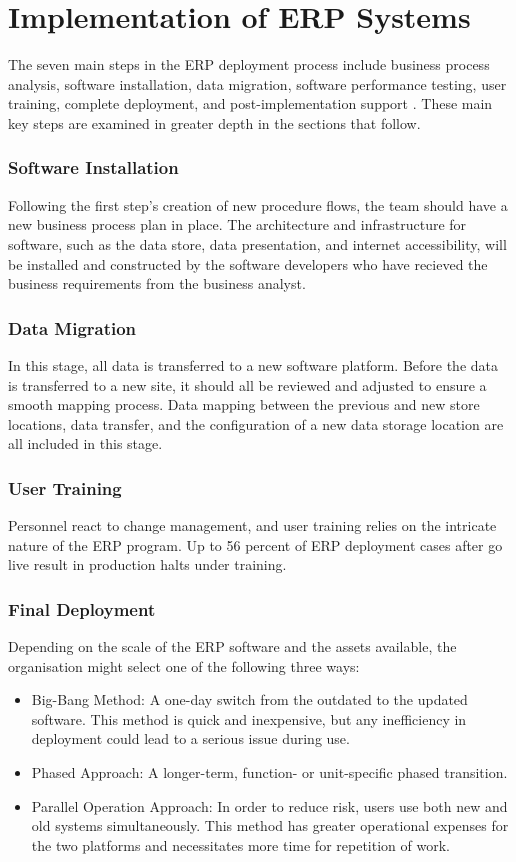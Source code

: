 \section{Implementation of ERP Systems}
\par{The seven main steps in the ERP deployment process include business process analysis, software installation, data migration, software performance testing, user training, complete deployment, and post-implementation support \citep{ly2020definitive}. These main key steps are examined in greater depth in the sections that follow.}
\subsubsection{Software Installation}
\par{Following the first step's creation of new procedure flows, the team should have a new business process plan in place. The architecture and infrastructure for software, such as the data store, data presentation, and internet accessibility, will be installed and constructed by the software developers who have recieved the business requirements from the business analyst.}
\subsubsection{Data Migration}
\par{In this stage, all data is transferred to a new software platform. Before the data is transferred to a new site, it should all be reviewed and adjusted to ensure a smooth mapping process. Data mapping between the previous and new store locations, data transfer, and the configuration of a new data storage location are all included in this stage.}
\subsubsection{User Training}
\par{Personnel react to change management, and user training relies on the intricate nature of the ERP program. Up to 56 percent of ERP deployment cases after go live result in production halts under training.}
\subsubsection{Final Deployment}
\par{Depending on the scale of the ERP software and the assets available, the organisation might select one of the following three ways:}
\begin{itemize}
    \item Big-Bang Method: A one-day switch from the outdated to the updated software. This method is quick and inexpensive, but any inefficiency in deployment could lead to a serious issue during use.
    \item Phased Approach: A longer-term, function- or unit-specific phased transition.
    \item Parallel Operation Approach: In order to reduce risk, users use both new and old systems simultaneously.
    This method has greater operational expenses for the two platforms and necessitates more time for repetition of work.
\end{itemize}
